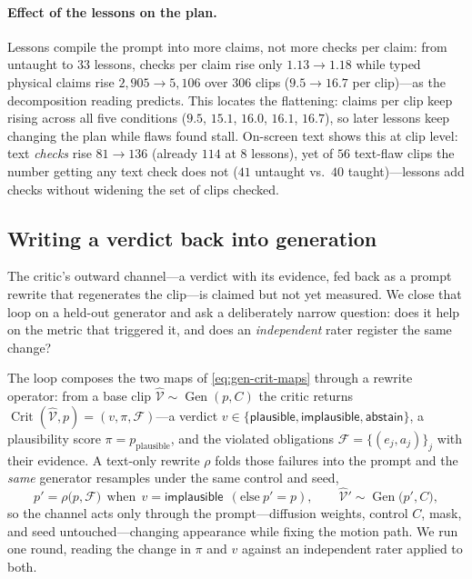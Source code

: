 \paragraph{Effect of the lessons on the plan.} Lessons compile the prompt into more claims, not more checks per claim: from untaught to $33$ lessons, checks per claim rise only $1.13\!\to\!1.18$ while typed physical claims rise $2{,}905\!\to\!5{,}106$ over $306$ clips ($9.5\!\to\!16.7$ per clip)---as the decomposition reading predicts. This locates the flattening: claims per clip keep rising across all five conditions ($9.5$, $15.1$, $16.0$, $16.1$, $16.7$), so later lessons keep changing the plan while flaws found stall. On-screen text shows this at clip level: text \emph{checks} rise $81\!\to\!136$ (already $114$ at $8$ lessons), yet of $56$ text-flaw clips the number getting any text check does not ($41$ untaught vs.\ $40$ taught)---lessons add checks without widening the set of clips checked.
\subsection{Writing a verdict back into generation}\label{sec:refine}
The critic's outward channel---a verdict with its evidence, fed back as a prompt rewrite that
regenerates the clip---is claimed but not yet measured. We close that loop on a held-out generator
and ask a deliberately narrow question: does it help on the metric that triggered it, and does an
\emph{independent} rater register the same change?

The loop composes the two maps of \cref{eq:gen-crit-maps} through a rewrite operator: from a base
clip $\hat{\mathcal{V}}\sim\operatorname{Gen}(p,C)$ the critic returns
$\operatorname{Crit}(\hat{\mathcal{V}},p)=(v,\pi,\mathcal{F})$---a verdict
$v\in\{\textsf{plausible},\textsf{implausible},\textsf{abstain}\}$, a plausibility score
$\pi=p_{\text{plausible}}$, and the violated obligations $\mathcal{F}=\{(e_j,a_j)\}_j$ with their
evidence. A text-only rewrite $\rho$ folds those failures into the prompt and
the \emph{same} generator resamples under the same control and seed,
\begin{equation}
  p' = \rho\bigl(p,\mathcal{F}\bigr)\ \ \text{when}\ \ v=\textsf{implausible}\ \ (\text{else}\ p'=p),
  \qquad
  \hat{\mathcal{V}}' \sim \operatorname{Gen}\bigl(p',C\bigr),
  \label{eq:refine-loop}
\end{equation}
so the channel acts only through the prompt---diffusion weights, control $C$, mask, and seed
untouched---changing appearance while fixing the motion path. We run one round, reading the change
in $\pi$ and $v$ against an independent rater applied to both.

